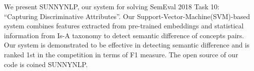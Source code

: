 We present SUNNYNLP, our system for solving SemEval 2018 Task 10: ``Capturing Discriminative Attributes''. Our Support-Vector-Machine(SVM)-based system combines features extracted from pre-trained embeddings and statistical information from Is-A taxonomy to detect semantic difference of concepts pairs. Our system is demonstrated to be effective in detecting semantic difference and is ranked 1st in the competition in terms of F1 measure. The open source of our code is coined SUNNYNLP.
